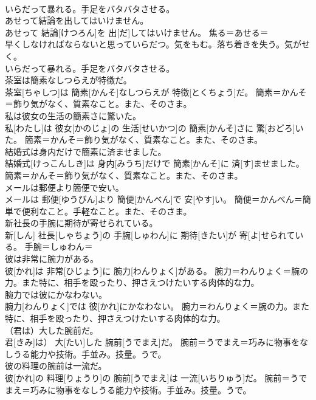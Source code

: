 \documentclass[8pt]{extreport}
\begin{document}
\begin{CJK}{UTF8}{min}
{\\	いらだって暴れる。手足をバタバタさせる。
\\	あせって結論を出してはいけません。	
\\	あせって 結論[けつろん]を 出[だ]してはいけません。	焦る＝あせる＝ 
\\	早くしなければならないと思っていらだつ。気をもむ。落ち着きを失う。気がせく。 
\\	いらだって暴れる。手足をバタバタさせる。
\\	茶室は簡素なしつらえが特徴だ。	
\\	茶室[ちゃしつ]は 簡素[かんそ]なしつらえが 特徴[とくちょう]だ。	簡素＝かんそ＝飾り気がなく、質素なこと。また、そのさま。
\\	私は彼女の生活の簡素さに驚いた。	
\\	私[わたし]は 彼女[かのじょ]の 生活[せいかつ]の 簡素[かんそ]さに 驚[おどろ]いた。	簡素＝かんそ＝飾り気がなく、質素なこと。また、そのさま。
\\	結婚式は身内だけで簡素に済ませました。	
\\	結婚式[けっこんしき]は 身内[みうち]だけで 簡素[かんそ]に 済[す]ませました。	簡素＝かんそ＝飾り気がなく、質素なこと。また、そのさま。
\\	メールは郵便より簡便で安い。	
\\	メールは 郵便[ゆうびん]より 簡便[かんべん]で 安[やす]い。	簡便＝かんべん＝簡単で便利なこと。手軽なこと。また、そのさま。
\\	新社長の手腕に期待が寄せられている。	
\\	新[しん] 社長[しゃちょう]の 手腕[しゅわん]に 期待[きたい]が 寄[よ]せられている。	手腕＝しゅわん＝ 
\\	彼は非常に腕力がある。	
\\	彼[かれ]は 非常[ひじょう]に 腕力[わんりょく]がある。	腕力＝わんりょく＝腕の力。また特に、相手を殴ったり、押さえつけたいする肉体的な力。
\\	腕力では彼にかなわない。	
\\	腕力[わんりょく]では 彼[かれ]にかなわない。	腕力＝わんりょく＝腕の力。また特に、相手を殴ったり、押さえつけたいする肉体的な力。
\\	（君は）大した腕前だ。	
\\	君[きみ]は） 大[たい]した 腕前[うでまえ]だ。	腕前＝うでまえ＝巧みに物事をなしうる能力や技術。手並み。技量。うで。
\\	彼の料理の腕前は一流だ。	
\\	彼[かれ]の 料理[りょうり]の 腕前[うでまえ]は 一流[いちりゅう]だ。	腕前＝うでまえ＝巧みに物事をなしうる能力や技術。手並み。技量。うで。
}
\end{CJK}
\end{document}
